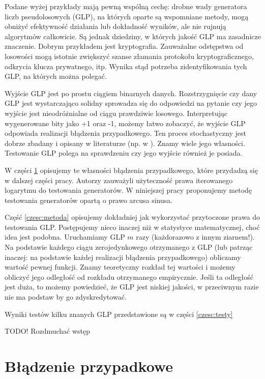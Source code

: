 \documentclass[a4paper,11pt,twoside]{book}
\theoremstyle{definition}
\begin{document}
Podane wyżej przykłady mają pewną wspólną cechę: drobne wady generatora liczb pseudolosowych (GLP), na których oparte są wspomniane metody, mogą obniżyć efektywność działania lub dokładność wyników, ale nie rujnują algorytmów całkowicie. Są jednak dziedziny, w których jakość GLP ma zasadnicze znaczenie. Dobrym przykładem jest kryptografia. Zauważalne odstępstwa od losowości mogą istotnie zwiększyć szanse złamania protokołu kryptograficznego, odkrycia klucza prywatnego, itp. Wynika stąd potrzeba zidentyfikowania tych GLP, na których można polegać.

Wyjście GLP jest po prostu ciągiem binarnych danych. Rozstrzygnięcie czy dany GLP jest wystarczająco solidny sprowadza się do odpowiedzi na pytanie czy jego wyjście jest nieodróżnialne od ciągu prawdziwie losowego. Interpretując wygenerowane bity jako +1 oraz -1, możemy łatwo zobaczyć, że wyjście GLP odpowiada realizacji błądzenia przypadkowego. Ten proces stochastyczny jest dobrze zbadany i opisany w literaturze (np. w \cite{feller}). Znamy wiele jego własności. Testowanie GLP polega na sprawdzeniu czy jego wyjście również je posiada.

W części \ref{czesc:bladzenie} opisujemy te własności błądzenia przypadkowego, które przydadzą się w dalszej części pracy. Autorzy \cite{wang-nic} zauważyli użyteczność prawa iterowanego logarytmu do testowania generatorów. W niniejszej pracy proponujemy metodę testowania generatorów opartą o prawo arcusa sinusa.

Część \ref{czesc:metoda} opisujemy dokładniej jak wykorzystać przytoczone prawa do testowania GLP. Postępujemy nieco inaczej niż w statystyce matematycznej, choć idea jest podobna. Uruchamiamy GLP $m$ razy (każdorazowo z innym ziarnem!). Na podstawie każdego ciągu zerojedynkowego otrzymanego z GLP (lub patrząc inaczej: na podstawie każdej realizacji błądzenia przypadkowego) obliczamy wartość pewnej funkcji. Znamy teoretyczny rozkład tej wartości i możemy obliczyć jego odległość od rozkładu otrzymanego empirycznie. Jeśli ta odległość jest duża, to możemy powiedzieć, że GLP jest niskiej jakości, w przeciwnym razie nie ma podstaw by go zdyskredytować.

Wyniki testów kilku znanych GLP przedstawione są w części \ref{czesc:testy}

{\bigskip \color{red} \LARGE{TODO!} Rozdmuchać wstęp}


\chapter{Błądzenie przypadkowe}
\label{czesc:bladzenie}
\end{document}
